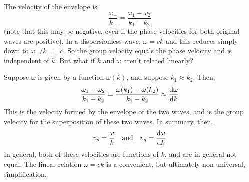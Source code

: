 The velocity of the envelope is 
\[ \frac{\omega_-}{k_-} = \frac{\omega_1-\omega_2}{k_1-k_2} \]
(note that this may be negative, even if the phase velocities for both original waves are positive). In a dispersionless wave, $\omega = ck$ and this reduces simply down to $\omega_-/k_- = c$. So the group velocity equals the phase velocity and is independent of $k$. But what if $k$ and $\omega$ aren't related linearly? 

Suppose $\omega$ is given by a function $\omega(k)$, and suppose $k_1\approx k_2$. Then, 
\[ \frac{\omega_1 - \omega_2}{k_1-k_2} = \frac{\omega(k_1) - \omega(k_2)}{k_1 - k_2} \approx \dv{\omega}{k}\]
This is the velocity formed by the envelope of the two waves, and is the group velocity for the superposition of these two waves. In summary, then,
\[ v_p = \frac{\omega}{k}\quad \text{and}\quad v_g = \dv{\omega}{k} \]
In general, both of these velocities are functions of $k$, and are in general not equal. The linear relation $\omega = ck$ is a convenient, but ultimately non-universal, simplification.
